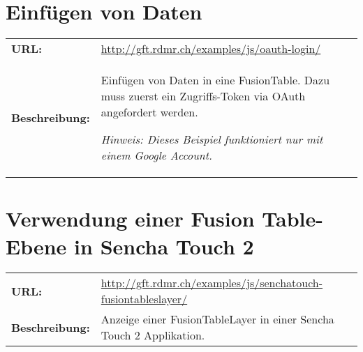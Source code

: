 \section{Einfügen von Daten}
\begin{tabular}{p{0.2\twocelltabwidth}p{0.8\twocelltabwidth}}
\textbf{URL:} & \url{http://gft.rdmr.ch/examples/js/oauth-login/} \\ 
\textbf{Beschreibung:} & Einfügen von Daten in eine FusionTable. Dazu muss zuerst ein Zugriffs-Token via OAuth angefordert werden.

\textit{Hinweis: Dieses Beispiel funktioniert nur mit einem Google Account.} \\ 
\end{tabular} 

\section{Verwendung einer Fusion Table-Ebene in Sencha Touch 2}
\begin{tabular}{p{0.2\twocelltabwidth}p{0.8\twocelltabwidth}}
\textbf{URL:} & \url{http://gft.rdmr.ch/examples/js/senchatouch-fusiontableslayer/} \\ 
\textbf{Beschreibung:} & Anzeige einer FusionTableLayer in einer Sencha Touch 2 Applikation. \\ 
\end{tabular} 